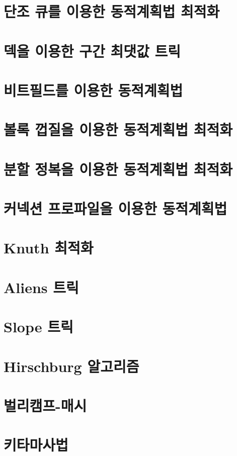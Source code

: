 \chapter{단조 큐를 이용한 동적계획법 최적화}


\chapter{덱을 이용한 구간 최댓값 트릭}


\chapter{비트필드를 이용한 동적계획법}


\chapter{볼록 껍질을 이용한 동적계획법 최적화}


\chapter{분할 정복을 이용한 동적계획법 최적화}


\chapter{커넥션 프로파일을 이용한 동적계획법}


\chapter{Knuth 최적화}


\chapter{Aliens 트릭}


\chapter{Slope 트릭}


\chapter{Hirschburg 알고리즘}


\chapter{벌리캠프-매시}


\chapter{키타마사법}

